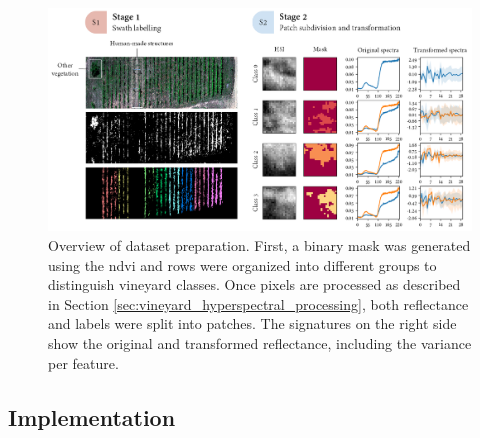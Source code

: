 \begin{figure}[ht]
    \centering
    \includegraphics[width=\linewidth]{figs/vineyard_classification/dataset.png}
	\caption{Overview of dataset preparation. First, a binary mask was generated using the \acrshort{ndvi} and rows were organized into different groups to distinguish vineyard classes. Once pixels are processed as described in Section \ref{sec:vineyard_hyperspectral_processing}, both reflectance and labels were split into patches. The signatures on the right side show the original and transformed reflectance, including the variance per feature. }
	\label{fig:vineyard_dataset}
\end{figure}

\subsection{Implementation}

